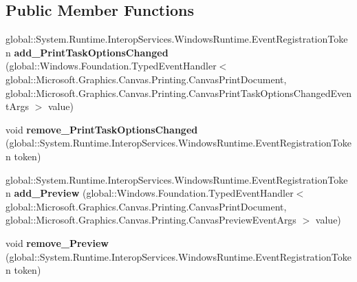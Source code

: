 \subsection*{Public Member Functions}
\begin{DoxyCompactItemize}
\item 
\mbox{\label{interface_microsoft_1_1_graphics_1_1_canvas_1_1_printing_1_1_i_canvas_print_document_a1de4b2e4a0bbe65d5a50f8cfd5b275ff}} 
global\+::\+System.\+Runtime.\+Interop\+Services.\+Windows\+Runtime.\+Event\+Registration\+Token {\bfseries add\+\_\+\+Print\+Task\+Options\+Changed} (global\+::\+Windows.\+Foundation.\+Typed\+Event\+Handler$<$ global\+::\+Microsoft.\+Graphics.\+Canvas.\+Printing.\+Canvas\+Print\+Document, global\+::\+Microsoft.\+Graphics.\+Canvas.\+Printing.\+Canvas\+Print\+Task\+Options\+Changed\+Event\+Args $>$ value)
\item 
\mbox{\label{interface_microsoft_1_1_graphics_1_1_canvas_1_1_printing_1_1_i_canvas_print_document_a1da96a2ebf4b67369628fa017a384b71}} 
void {\bfseries remove\+\_\+\+Print\+Task\+Options\+Changed} (global\+::\+System.\+Runtime.\+Interop\+Services.\+Windows\+Runtime.\+Event\+Registration\+Token token)
\item 
\mbox{\label{interface_microsoft_1_1_graphics_1_1_canvas_1_1_printing_1_1_i_canvas_print_document_abaff1fcd43de732d25ae88fef48a23a9}} 
global\+::\+System.\+Runtime.\+Interop\+Services.\+Windows\+Runtime.\+Event\+Registration\+Token {\bfseries add\+\_\+\+Preview} (global\+::\+Windows.\+Foundation.\+Typed\+Event\+Handler$<$ global\+::\+Microsoft.\+Graphics.\+Canvas.\+Printing.\+Canvas\+Print\+Document, global\+::\+Microsoft.\+Graphics.\+Canvas.\+Printing.\+Canvas\+Preview\+Event\+Args $>$ value)
\item 
\mbox{\label{interface_microsoft_1_1_graphics_1_1_canvas_1_1_printing_1_1_i_canvas_print_document_a86ed67a2bf892a9f75d0f01ef8fa6436}} 
void {\bfseries remove\+\_\+\+Preview} (global\+::\+System.\+Runtime.\+Interop\+Services.\+Windows\+Runtime.\+Event\+Registration\+Token token)

\end{DoxyCompactItemize}
